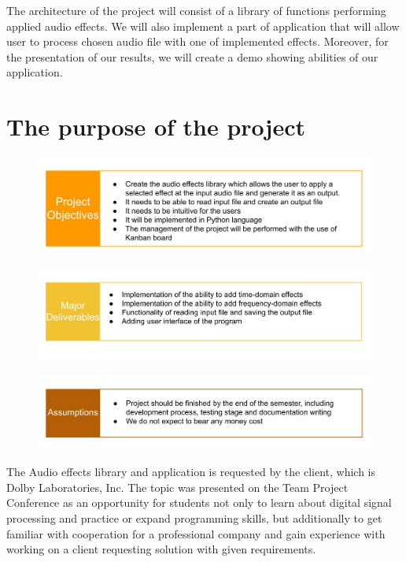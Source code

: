 \documentclass[12pt]{article}
\begin{document}
The architecture of the project will consist of a library of functions performing applied audio effects. We will also implement a part of application that will allow user to process chosen audio file with one of implemented effects. Moreover, for the presentation of our results, we will create a demo showing abilities of our application.

\section{The purpose of the project}

	\begin{figure}[H]
		\includegraphics[width=1.2\textwidth, center]{Project Objectives}
	\end{figure}
	
	\begin{figure}[H]
		\includegraphics[width=1.2\textwidth, center]{Major Deliverables}
	\end{figure}
	
	\begin{figure}[H]
		\includegraphics[width=1.2\textwidth, center]{Assumptions}
	\end{figure}

The Audio effects library and application is requested by the client, which is  Dolby Laboratories, Inc. The topic was presented on the Team Project Conference as an opportunity for students not only to learn about digital signal processing and practice or expand programming skills, but additionally to get familiar with cooperation for a professional company and gain experience with working on a client requesting solution with given requirements.
\end{document}
